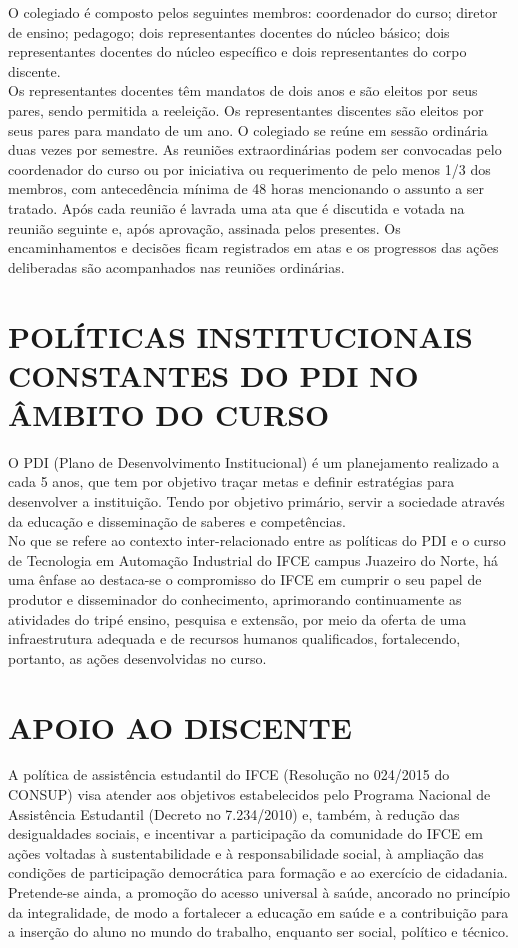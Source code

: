 O colegiado é composto pelos seguintes membros: coordenador do curso; diretor de ensino; pedagogo; dois representantes docentes do núcleo básico; dois representantes docentes do núcleo específico e dois representantes do corpo discente.\\

Os representantes docentes têm mandatos de dois anos e são eleitos por seus pares, sendo permitida a reeleição. Os representantes discentes são eleitos por seus pares para mandato de um ano. O colegiado se reúne em sessão ordinária duas vezes por semestre. As reuniões extraordinárias podem ser convocadas pelo coordenador do curso ou por iniciativa ou requerimento de pelo menos 1/3 dos membros, com antecedência mínima de 48 horas mencionando o assunto a ser tratado. Após cada reunião é lavrada uma ata que é discutida e votada na reunião seguinte e, após aprovação, assinada pelos presentes. Os encaminhamentos e decisões ficam registrados em atas e os progressos das ações deliberadas são acompanhados nas reuniões ordinárias.\\

\chapter{POLÍTICAS INSTITUCIONAIS CONSTANTES DO PDI NO ÂMBITO DO CURSO}

O PDI (Plano de Desenvolvimento Institucional) é um planejamento realizado a cada 5 anos, que tem por objetivo traçar metas e definir estratégias para desenvolver a instituição. Tendo por objetivo primário, servir a sociedade através da educação e disseminação de saberes e competências.\\ 

No que se refere ao contexto inter-relacionado entre as políticas do PDI e o
curso de Tecnologia em Automação Industrial do IFCE campus Juazeiro do Norte, há uma ênfase ao destaca-se o compromisso do IFCE em cumprir o seu papel de produtor e disseminador do conhecimento, aprimorando continuamente as atividades do tripé ensino, pesquisa e extensão, por meio da oferta de uma infraestrutura adequada e de recursos humanos qualificados, fortalecendo, portanto, as ações desenvolvidas 
no curso.\\

\chapter{APOIO AO DISCENTE}

A política de assistência estudantil do IFCE (Resolução no 024/2015 do CONSUP) visa atender aos objetivos estabelecidos pelo Programa Nacional de Assistência Estudantil (Decreto no 7.234/2010) e, também, à redução das desigualdades sociais, e incentivar a participação da comunidade do IFCE em ações voltadas à sustentabilidade e à responsabilidade social, à ampliação das condições de participação democrática para formação e ao exercício de cidadania. Pretende-se ainda, a promoção do acesso universal à saúde, ancorado no princípio da integralidade, de modo a fortalecer a educação em saúde e a contribuição para a inserção do aluno no mundo do trabalho, enquanto ser social, político e técnico.\\

